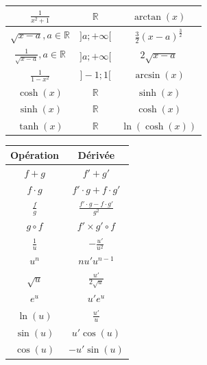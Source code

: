 \documentclass[8pt]{article}
\begin{document}
\begin{center}
\begin{tabular}{|c|c|c|}
                            $ \frac{1}{x^2+1}$ & $ \mathbb{R}$ & $ \arctan(x)$\\
                            \hline
                            $ \sqrt{x-a}, a \in \mathbb{R}$ & $ ]a;+\infty[ $ & $ \frac{3}{2}(x-a)^{\frac{3}{2}}$\\
                            \hline
                            $ \frac{1}{\sqrt{x-a}}, a \in \mathbb{R}$ & $ ]a;+\infty[ $ & $ 2\sqrt{x-a}$\\
                            \hline
                            $ \frac{1}{1-x^2}$ & $ ]-1;1[$ & $ \arcsin(x)$\\
                            \hline
                            $ \cosh(x)$ & $ \mathbb{R}$ & $ \sinh(x)$\\
                            \hline 
                            $ \sinh(x)$ & $ \mathbb{R}$ & $ \cosh(x)$\\
                            \hline
                            $ \tanh(x)$ & $ \mathbb{R} $ & $ \ln(\cosh(x))$\\
                            \hline 
                        \end{tabular}
                    \end{center}
                    \begin{center}
                        \renewcommand{\arraystretch}{1.5}
                        \begin{tabular}{|c|c|}
                            \hline
                            \textbf{Opération} & \textbf{Dérivée} \\
                            \hline 
                            \hline
                            $f+g$ & $f'+g'$\\
                            \hline
                            $f \cdot g$ & $f' \cdot g + f \cdot g'$\\
                            \hline
                            $\frac{f}{g} $ & $\frac{f' \cdot g - f \cdot g'}{g^2}$\\
                            \hline
                            $g \circ f$ & $f'\times g' \circ f$\\
                            \hline
                            $\frac{1}{u}$ & $-\frac{u'}{u^2}$\\
                            \hline
                            $u^n$ & $nu'u^{n-1}$\\
                            \hline
                            $\sqrt{u}$ & $\frac{u'}{2\sqrt{u}}$\\
                            \hline
                            $e^{u}$ & $u'e^{u}$\\
                            \hline
                            $\ln(u)$ & $\frac{u'}{u}$\\
                            \hline
                            $\sin(u)$ & $u'\cos(u)$\\
                            \hline
                            $\cos(u)$ & $-u'\sin(u)$\\
                            \hline
                        \end{tabular}
                    \end{center}
\end{document}
